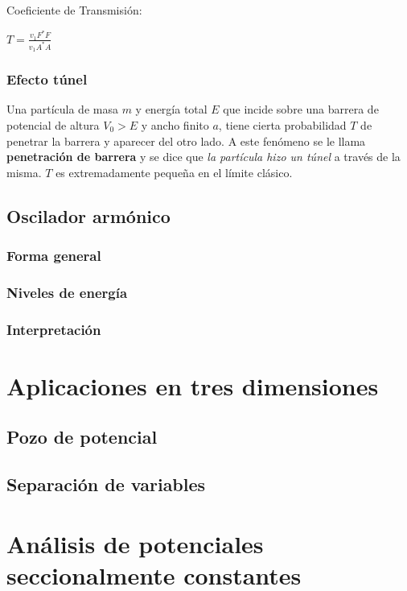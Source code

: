 \documentclass[oneside]{book}
\numberwithin{equation}{section}
\numberwithin{figure}{section}
\numberwithin{table}{section}
\begin{document}
\begin{minipage}[t]{0.49\textwidth}
				\begin{center}
					Coeficiente de Transmisión:\\
				\end{center}
				\begin{center}
					$\displaystyle T=\frac{v_1F^*F}{v_1A^*A}$
				\end{center}			
				
			\end{minipage}
	
					\subsubsection{Efecto túnel}
					
						Una partícula de masa $m$ y energía total $E$ que incide sobre una barrera de potencial de altura $V_0>E$ y ancho finito $a$, tiene cierta probabilidad $T$ de penetrar la barrera y aparecer del otro lado. A este fenómeno se le llama \textbf{penetración de barrera }y se dice que \textit{la partícula hizo un túnel} a través de la misma. $T$ es extremadamente pequeña en el límite clásico.
					
				\subsection{Oscilador armónico}
					\subsubsection{Forma general}
					\subsubsection{Niveles de energía}
					\subsubsection{Interpretación}
		\section{Aplicaciones en tres dimensiones}
				\subsection{Pozo de potencial}
				\subsection{Separación de variables}
		\section{Análisis de potenciales seccionalmente constantes}		
\end{document}
